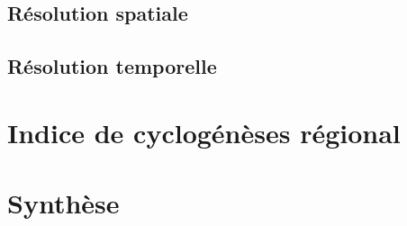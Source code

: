 \documentclass[../main.tex]{subfiles}
\begin{document}
\subsection{Résolution spatiale}

\subsection{Résolution temporelle}

\section{Indice de cyclogénèses régional}

%
%
%
%


\section{Synthèse}
\end{document}
